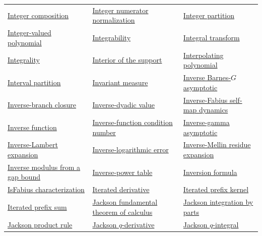 \documentclass[11pt,oneside]{article}
\begin{document}
\begin{longtable}{L{0.31\textwidth}L{0.31\textwidth}L{0.31\textwidth}}
\hyperlink{gls:integer-composition}{Integer composition} & \hyperlink{gls:integer-numerator-normalization}{Integer numerator normalization} & \hyperlink{gls:integer-partition}{Integer partition} \\
\hyperlink{gls:integer-valued-polynomial}{Integer-valued polynomial} & \hyperlink{gls:integrability}{Integrability} & \hyperlink{gls:integral-transform}{Integral transform} \\
\hyperlink{gls:integrality}{Integrality} & \hyperlink{gls:interior-support}{Interior of the support} & \hyperlink{gls:interpolating-polynomial}{Interpolating polynomial} \\
\hyperlink{gls:interval-partition}{Interval partition} & \hyperlink{gls:invariant-measure}{Invariant measure} & \hyperlink{gls:inverse-barnes-g-asymptotic}{Inverse Barnes-\(G\) asymptotic} \\
\hyperlink{gls:inverse-branch-closure}{Inverse-branch closure} & \hyperlink{gls:inverse-dyadic-value}{Inverse-dyadic value} & \hyperlink{gls:inverse-fabius-self-map-dynamics}{Inverse-Fabius self-map dynamics} \\
\hyperlink{gls:inverse-function}{Inverse function} & \hyperlink{gls:inverse-function-condition-number}{Inverse-function condition number} & \hyperlink{gls:inverse-gamma-asymptotic}{Inverse-gamma asymptotic} \\
\hyperlink{gls:inverse-lambert-expansion}{Inverse-Lambert expansion} & \hyperlink{gls:inverse-logarithmic-error}{Inverse-logarithmic error} & \hyperlink{gls:inverse-mellin-residue-expansion}{Inverse-Mellin residue expansion} \\
\hyperlink{gls:inverse-gap-modulus}{Inverse modulus from a gap bound} & \hyperlink{gls:inverse-power-table}{Inverse-power table} & \hyperlink{gls:inversion-formula}{Inversion formula} \\
\hyperlink{gls:fabius-isfabius-characterization}{IsFabius characterization} & \hyperlink{gls:iterated-derivative}{Iterated derivative} & \hyperlink{gls:iterated-prefix-kernel}{Iterated prefix kernel} \\
\hyperlink{gls:iterated-prefix-sum}{Iterated prefix sum} & \hyperlink{gls:jackson-fundamental-theorem}{Jackson fundamental theorem of calculus} & \hyperlink{gls:jackson-integration-by-parts}{Jackson integration by parts} \\
\hyperlink{gls:jackson-product-rule}{Jackson product rule} & \hyperlink{gls:jackson-q-derivative}{Jackson \(q\)-derivative} & \hyperlink{gls:jackson-q-integral}{Jackson \(q\)-integral} \\

\end{longtable}
\end{document}

